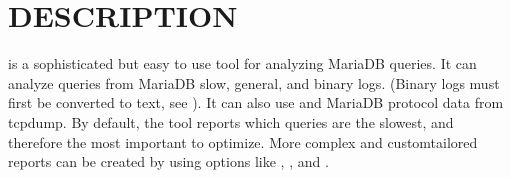 \documentclass[letterpaper,10pt,english]{sphinxmanual}
\begin{document}
\section{DESCRIPTION}
\label{\detokenize{mariadb-query-digest:description}}
\sphinxAtStartPar
{} is a sophisticated but easy to use tool for analyzing
MariaDB queries.  It can analyze queries from MariaDB slow, general, and binary
logs. (Binary logs must first be converted to text, see {\hyperref[\detokenize{mariadb-query-digest:cmdoption-mariadb-query-digest-type}]{}}).
It can also use  and MariaDB protocol data from tcpdump.
By default, the tool reports which queries are the slowest, and therefore
the most important to optimize.  More complex and custom\sphinxhyphen{}tailored reports
can be created by using options like {\hyperref[\detokenize{mariadb-query-digest:cmdoption-mariadb-query-digest-group-by}]{}}, {\hyperref[\detokenize{mariadb-query-digest:cmdoption-mariadb-query-digest-filter}]{}}, and
{\hyperref[\detokenize{mariadb-query-digest:cmdoption-mariadb-query-digest-embedded-attributes}]{}}.
\end{document}
